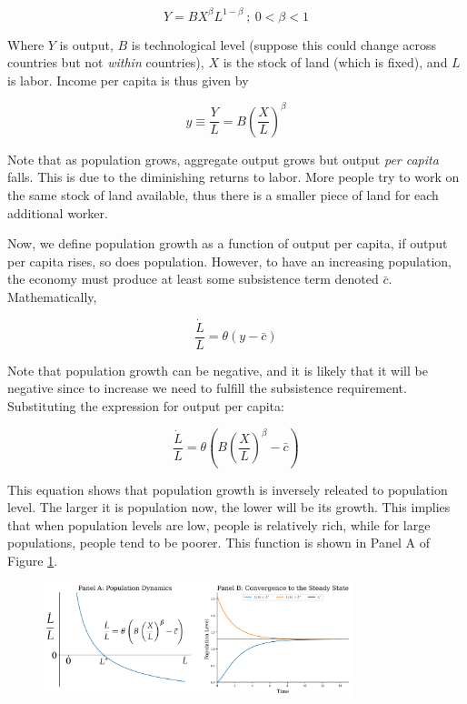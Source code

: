 \documentclass[a4paper,11pt]{article}
\theoremstyle{definition}
\theoremstyle{plain}
\begin{document}
\[
Y = B X^{\beta}L^{1-\beta} \ ; \ 0 < \beta < 1
\]

Where \(Y\) is output, \(B\) is technological level (suppose this could change across countries but not \emph{within} countries), \(X\) is the stock of land (which is fixed), and \(L\) is labor. Income per capita is thus given by

\[
y \equiv \frac{Y}{L} = B\left(\frac{X}{L}\right)^{\beta}
\]

Note that as population grows, aggregate output grows but output \emph{per capita} falls. This is due to the diminishing returns to labor. More people try to work on the same stock of land available, thus there is a smaller piece of land for each additional worker.

Now, we define population growth as a function of output per capita, if output per capita rises, so does population. However, to have an increasing population, the economy must produce at least some subsistence term denoted \(\bar{c}\). Mathematically,

\[
\frac{\dot{L}}{L} = \theta\left(y - \bar{c}\right)
\]

Note that population growth can be negative, and it is likely that it will be negative since to increase we need to fulfill the subsistence requirement. Substituting the expression for output per capita:

\[
\frac{\dot{L}}{L} = \theta\left(B\left(\frac{X}{L}\right)^{\beta} - \bar{c}\right)
\]

This equation shows that population growth is inversely releated to population level. The larger it is population now, the lower will be its growth. This implies that when population levels are low, people is relatively rich, while for large populations, people tend to be poorer. This function is shown in Panel A of Figure \ref{fig:malthus_phase}.

 \begin{figure}[htbp]
 	\centering 
 		\includegraphics[width = 0.8\textwidth]{Ch3_files/Ch3_28_0.pdf}
 		\caption{}
 		\label{fig:malthus_phase}
 \end{figure}
    
\end{document}
